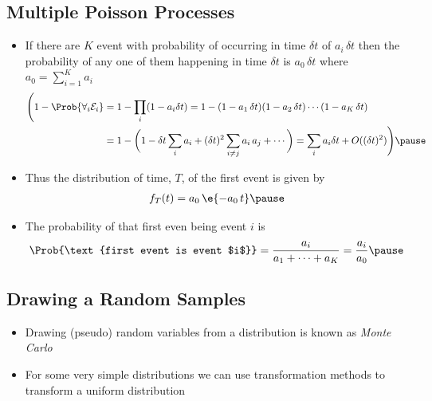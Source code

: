 \begin{slide}
\section[-2]{Multiple Poisson Processes}

\begin{PauseHighLight}
  \begin{itemize}
  \item If there are $K$ event with probability of occurring in time
    $\delta t$ of $a_i\,\delta t$ then the probability of any one
    of them happening in time $\delta t$ is $a_0 \,\delta t$ where
    $a_0=\sum_{i=1}^K a_i$\pause
    {\footnotesize
    \begin{align*}
      \Biggl( 1-\Prob{\forall_i \mathcal{E}_i}
      &= 1 - \prod_i (1-a_i \delta t)
        = 1 - (1-a_1\,\delta t)(1-a_2\,\delta t)\cdots  (1-a_K\,\delta t)
      \\
       &= 1 - \biggl( 1 -\delta t \sum_i a_i + (\delta t)^2 \sum_{i\neq j} a_i\,a_j + \cdots\biggr)
        = \sum_i a_i \delta t +  O((\delta t)^2) \Biggr)\pause
    \end{align*}}
  \item Thus the distribution of time, $T$, of the first event is given
    by
    \begin{align*}
      f_T(t) = a_0\,\e{-a_0\,t}\pause
    \end{align*}
  \item The probability of that first even being event $i$ is
    \begin{align*}
      \Prob{\text{first event is event $i$}} =
      \frac{a_i}{a_1+\cdots+a_K} = \frac{a_i}{a_0}\pause
    \end{align*}
  \end{itemize}
\end{PauseHighLight}

\end{slide}


\begin{slide}
\section[-2]{Drawing a Random Samples}

\pb
\begin{itemize}
\item Drawing (pseudo) random variables from a distribution is known
  as \emph{Monte Carlo}\pauseh
\item For some very simple distributions we can use transformation
  methods to transform a uniform distribution\pauseh
\end{itemize}
\begin{center}
  \pause
\end{center}

\end{slide}


